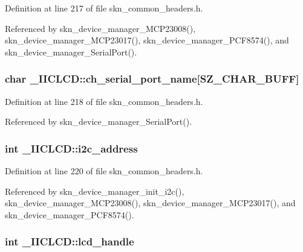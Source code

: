 Definition at line 217 of file skn\+\_\+common\+\_\+headers.\+h.



Referenced by skn\+\_\+device\+\_\+manager\+\_\+\+M\+C\+P23008(), skn\+\_\+device\+\_\+manager\+\_\+\+M\+C\+P23017(), skn\+\_\+device\+\_\+manager\+\_\+\+P\+C\+F8574(), and skn\+\_\+device\+\_\+manager\+\_\+\+Serial\+Port().

\hypertarget{struct___i_i_c_l_c_d_a2f193b0806fdbba1d644567835e2b2e8}{
\subsubsection[{ch\+\_\+serial\+\_\+port\+\_\+name}]{\setlength{\rightskip}{0pt plus 5cm}char \+\_\+\+I\+I\+C\+L\+C\+D\+::ch\+\_\+serial\+\_\+port\+\_\+name\mbox{[}{\bf S\+Z\+\_\+\+C\+H\+A\+R\+\_\+\+B\+U\+F\+F}\mbox{]}}}\label{struct___i_i_c_l_c_d_a2f193b0806fdbba1d644567835e2b2e8}


Definition at line 218 of file skn\+\_\+common\+\_\+headers.\+h.



Referenced by skn\+\_\+device\+\_\+manager\+\_\+\+Serial\+Port().

\hypertarget{struct___i_i_c_l_c_d_a3f3fe8757875939b987ac0c416081551}{
\subsubsection[{i2c\+\_\+address}]{\setlength{\rightskip}{0pt plus 5cm}int \+\_\+\+I\+I\+C\+L\+C\+D\+::i2c\+\_\+address}}\label{struct___i_i_c_l_c_d_a3f3fe8757875939b987ac0c416081551}


Definition at line 220 of file skn\+\_\+common\+\_\+headers.\+h.



Referenced by skn\+\_\+device\+\_\+manager\+\_\+init\+\_\+i2c(), skn\+\_\+device\+\_\+manager\+\_\+\+M\+C\+P23008(), skn\+\_\+device\+\_\+manager\+\_\+\+M\+C\+P23017(), and skn\+\_\+device\+\_\+manager\+\_\+\+P\+C\+F8574().

\hypertarget{struct___i_i_c_l_c_d_afc74b2d9120be4a8e69e48b220d6781c}{
\subsubsection[{lcd\+\_\+handle}]{\setlength{\rightskip}{0pt plus 5cm}int \+\_\+\+I\+I\+C\+L\+C\+D\+::lcd\+\_\+handle}}\label{struct___i_i_c_l_c_d_afc74b2d9120be4a8e69e48b220d6781c}


